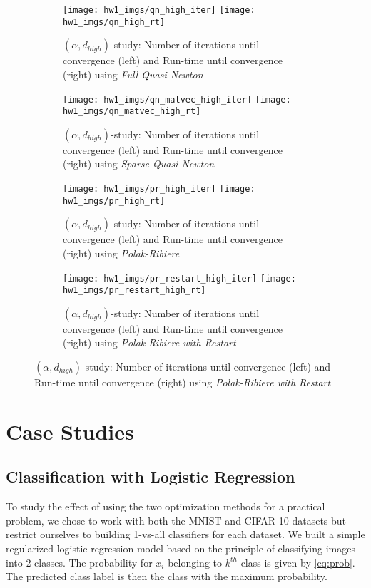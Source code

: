 \begin{figure}[h!]
    \begin{subfigure}{\textwidth}
      \texttt{[image: hw1\_imgs/qn\_high\_iter]}\hfill
      \texttt{[image: hw1\_imgs/qn\_high\_rt]}
      \caption{$(\alpha,d_{high})$-study: Number of iterations until convergence (left) and Run-time until convergence (right) using \textit{Full Quasi-Newton}}
      \label{fig:high_fqn}
    \end{subfigure}%
    \begin{subfigure}{\textwidth}
      \texttt{[image: hw1\_imgs/qn\_matvec\_high\_iter]}\hfill
      \texttt{[image: hw1\_imgs/qn\_matvec\_high\_rt]}
      \caption{$(\alpha,d_{high})$-study: Number of iterations until convergence (left) and Run-time until convergence (right) using \textit{Sparse Quasi-Newton}}
      \label{fig:high_sqn}
    \end{subfigure}%
    \begin{subfigure}{\textwidth}
      \texttt{[image: hw1\_imgs/pr\_high\_iter]}\hfill
      \texttt{[image: hw1\_imgs/pr\_high\_rt]}
      \caption{$(\alpha,d_{high})$-study: Number of iterations until convergence (left) and Run-time until convergence (right) using \textit{Polak-Ribiere}}
      \label{fig:high_pr}
    \end{subfigure}
    \begin{subfigure}{\textwidth}
      \texttt{[image: hw1\_imgs/pr\_restart\_high\_iter]}\hfill
      \texttt{[image: hw1\_imgs/pr\_restart\_high\_rt]}
      \caption{$(\alpha,d_{high})$-study: Number of iterations until convergence (left) and Run-time until convergence (right) using \textit{Polak-Ribiere with Restart}}
      \label{fig:high_prr}
    \end{subfigure}
\end{figure}

\newpage
\section{Case Studies}
\subsection{Classification with Logistic Regression}
To study the effect of using the two optimization methods for a practical problem, we chose to work with both the MNIST and CIFAR-10 datasets but restrict ourselves to building 1-vs-all classifiers for each dataset. We built a simple regularized logistic regression model based on the principle of classifying images into 2 classes. The probability for $x_i$ belonging to $k^{th}$ class is given by \eqref{eq:prob}. The predicted class label is then the class with the maximum probability.

